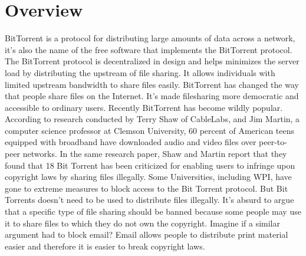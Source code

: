 \documentclass[a4paper,12pt]{report}
\begin{document}
\section{Overview}
BitTorrent is a protocol for distributing large amounts of data across a network, it's also the name of the free software that implements the BitTorrent protocol. The BitTorrent protocol is decentralized in design and helps minimizes the server load by distributing the upstream of file sharing. It allows individuals with limited upstream bandwidth to share files easily. BitTorrent has changed the way that people share files on the Internet. It's made filesharing more democratic and accessible to ordinary users.
Recently BitTorrent has become wildly popular. According to research conducted by Terry Shaw of CableLabs, and Jim Martin, a computer science professor at Clemson University, 60 percent of American teens equipped with broadband have downloaded audio and video files over peer-to-peer networks. In the same research paper, Shaw and Martin report that they found that 18%
Bit Torrent has been criticized for enabling users to infringe upon copyright laws by sharing files illegally. Some Universities, including WPI, have gone to extreme measures to block access to the Bit Torrent protocol. But Bit Torrents doesn’t need to be used to distribute files illegally. It’s absurd to argue that a specific type of file sharing should be banned because some people may use it to share files to which they do not own the copyright. Imagine if a similar argument had to block email? Email allows people to distribute print material easier and therefore it is easier to break copyright laws.
\end{document}
